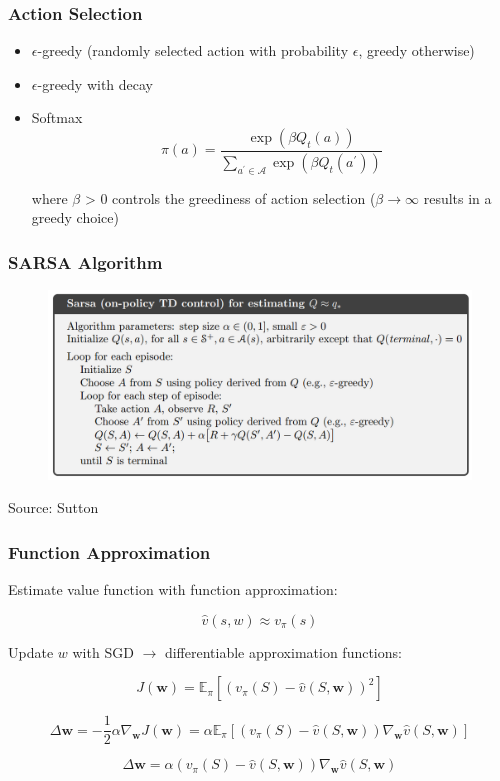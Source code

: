 \documentclass{beamer}
\begin{document}
\begin{frame}
\frametitle{Action Selection}

\begin{itemize}
	\item $\epsilon$-greedy (randomly selected action 
	with probability $\epsilon$, greedy otherwise)
	\item $\epsilon$-greedy with decay
	\item Softmax
$$
\pi(a)=\frac{\exp \left(\beta Q_{t}(a)\right)}{\sum_{a^{\prime} \in \mathcal{A}} \exp \left(\beta Q_{t}\left(a^{\prime}\right)\right)}
$$
	
	where $\beta$ > 0 controls the greediness of action selection
	($\beta \rightarrow \infty$ results in a greedy choice)
\end{itemize}
\end{frame}


\begin{frame}
\frametitle{SARSA Algorithm}

\begin{figure}
	\includegraphics[scale=0.4]{sarsa}
\end{figure}

Source: Sutton

\end{frame}


\begin{frame}
\frametitle{Function Approximation}

Estimate value function with function approximation:

$$
\hat{v}(s, w) \approx v_{\pi}(s)
$$

Update $w$ with SGD $\rightarrow$ differentiable 
approximation functions:

$$
J(\mathbf{w})=\mathbb{E}_{\pi}\left[\left(v_{\pi}(S)-\hat{v}(S, \mathbf{w})\right)^{2}\right]
$$

$$
\Delta \mathbf{w} =-\frac{1}{2} \alpha \nabla_{\mathbf{w}} J(\mathbf{w})
 =\alpha \mathbb{E}_{\pi}\left[\left(v_{\pi}(S)-\hat{v}(S, \mathbf{w})\right) \nabla_{\mathbf{w}} \hat{v}(S, \mathbf{w})\right] 
$$

$$
\Delta \mathbf{w}=\alpha\left(v_{\pi}(S)-\hat{v}(S, \mathbf{w})\right) \nabla_{\mathbf{w}} \hat{v}(S, \mathbf{w})
$$

\end{frame}
\end{document}
